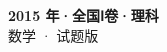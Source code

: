 \documentclass[zihao=-4, a4paper]{ctexart}
\begin{document}
\begin{center}
  {\Large\bfseries 2015 年·全国Ⅰ卷·理科}\\[4pt]
  {\large 数学 · 试题版}
\end{center}
\medskip
{}

\end{document}
